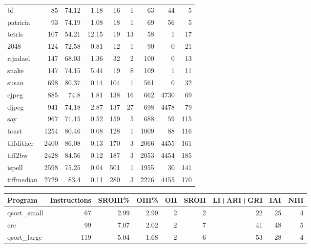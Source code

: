 \begin{tabular}{lrrrrrrrr}
 bf              &       85 &    74.12 &   1.18 &   16 &    1 &     63 &    44 &     5 \\
 patricia        &       93 &    74.19 &   1.08 &   18 &    1 &     69 &    56 &     5 \\
 tetris          &      107 &    54.21 &  12.15 &   19 &   13 &     58 &     1 &    17 \\
 2048            &      124 &    72.58 &   0.81 &   12 &    1 &     90 &     0 &    21 \\
 rijndael        &      147 &    68.03 &   1.36 &   32 &    2 &    100 &     0 &    13 \\
 snake           &      147 &    74.15 &   5.44 &   19 &    8 &    109 &     1 &    11 \\
 susan           &      698 &    80.37 &   0.14 &  104 &    1 &    561 &     0 &    32 \\
 cjpeg           &      885 &    74.8  &   1.81 &  138 &   16 &    662 &  4730 &    69 \\
 djpeg           &      941 &    74.18 &   2.87 &  137 &   27 &    698 &  4478 &    79 \\
 say             &      967 &    71.15 &   0.52 &  159 &    5 &    688 &    59 &   115 \\
 toast           &     1254 &    80.46 &   0.08 &  128 &    1 &   1009 &    88 &   116 \\
 tiffdither      &     2400 &    86.08 &   0.13 &  170 &    3 &   2066 &  4455 &   161 \\
 tiff2bw         &     2428 &    84.56 &   0.12 &  187 &    3 &   2053 &  4454 &   185 \\
 ispell          &     2598 &    75.25 &   0.04 &  501 &    1 &   1955 &    30 &   141 \\
 tiffmedian      &     2729 &    83.4  &   0.11 &  280 &    3 &   2276 &  4455 &   170 \\
\hline
\end{tabular}\begin{tabular}{lrrrrrrrr}
\hline
 Program         &   Instructions &   SROHI\% &   OHI\% &   OH &   SROH &   LI+ARI+GRI &   IAI &   NHI \\
\hline
 qsort\_small     &             67 &     2.99 &   2.99 &    2 &      2 &           22 &    25 &     4 \\
 crc             &             99 &     7.07 &   2.02 &    2 &      7 &           41 &    48 &     5 \\
 qsort\_large     &            119 &     5.04 &   1.68 &    2 &      6 &           53 &    28 &     4 \\

\end{tabular}
